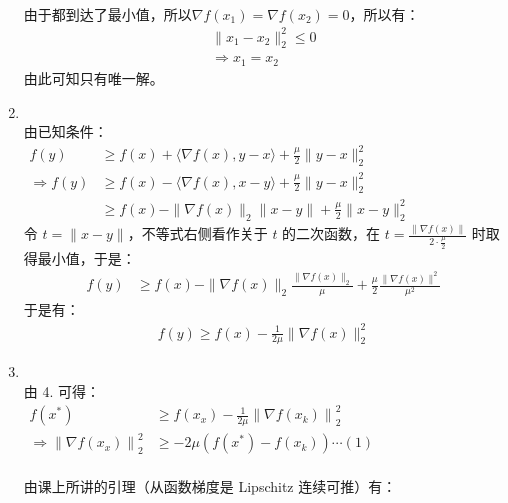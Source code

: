 \documentclass[11pt,letter,notitlepage]{article}
\begin{document}
\begin{solution}
\begin{enumerate}
\begin{align*}
        \end{align*}
        由于都到达了最小值，所以$\nabla f(x_1) = \nabla f(x_2) = 0$，所以有：\\
        \begin{align*}
            \|x_1-x_2\|_{2}^{2} \leq 0\\
            \Rightarrow x_1 = x_2
        \end{align*}
        由此可知只有唯一解。
        \item \ \\由已知条件：\\
        $ \begin{aligned} f(y) & \geqslant f(x)+\langle\nabla f(x), y-x\rangle+\frac{\mu}{2}\|y-x\|_{2}^{2} \\ \Rightarrow f(y) & \geqslant f(x) - \langle\nabla f(x), x-y\rangle+\frac{\mu}{2}\|y-x\|_{2}^{2} \\ & \geqslant f(x)-\|\nabla f(x)\|_{2}\|x-y\|+\frac{\mu}{2}\|x - y\|_{2}^{2}  \end{aligned} $\\
        令 $t = \|x - y \|$，不等式右侧看作关于 $t$ 的二次函数，在 $t= \frac{\|\nabla f(x)\|}{2 \cdot \frac{\mu}{2}}$ 时取得最小值，于是：\\
        \begin{align*}
            f(y) &\geqslant f(x)-\|\nabla f(x)\|_{2} \frac{\|\nabla f(x)\|_{2}}{\mu}+\frac{\mu}{2} \frac{\|\nabla f(x)\|^{2}}{\mu^{2}}
        \end{align*}
        于是有：\\
        \begin{align*}
            f(y) \geqslant f(x)-\frac{1}{2 \mu}\|\nabla f(x)\|_{2}^{2}
        \end{align*}
        \item \ \\
        由 4. 可得：\\
        $\begin{aligned} f\left(x^{*}\right) & \geqslant f\left(x_{x}\right)-\frac{1}{2 \mu}\left\|\nabla f\left(x_{k}\right)\right\|_{2}^{2} \\ \Rightarrow\left\|\nabla f\left(x_{x}\right)\right\|_{2}^{2} & \geqslant -2 \mu\left(f\left(x^{*}\right)-f\left(x_{k}\right)\right) \cdots (1)  \end{aligned}$\\ \ \\
        由课上所讲的引理（从函数梯度是 Lipschitz 连续可推）有：
        \begin{align*}

\end{align*}
\end{enumerate}
\end{solution}
\end{document}
